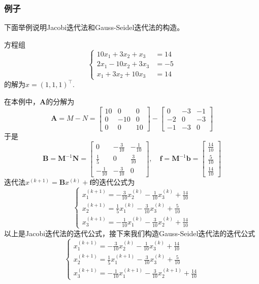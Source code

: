 \subsubsection{例子}
下面举例说明Jacobi迭代法和Gauss-Seidel迭代法的构造。
\begin{example}
    方程组
    $$
        \left\{\begin{aligned}
            10 x_1+3 x_2+x_3   & =14 \\
            2 x_1-10 x_2+3 x_3 & =-5 \\
            x_1+3 x_2+10 x_3   & =14
        \end{aligned}\right.
    $$
    的解为$x=(1,1,1)^\top$.
\end{example}
在本例中，$\boldsymbol{A}$的分解为
\[
    \boldsymbol{A}=M-N=\begin{bmatrix}
        10 & 0   & 0  \\
        0  & -10 & 0  \\
        0  & 0   & 10
    \end{bmatrix}-\begin{bmatrix}
        0  & -3 & -1 \\
        -2 & 0  & -3 \\
        -1 & -3 & 0
    \end{bmatrix}
\]
于是
\[
    \boldsymbol{B}=\boldsymbol{M}^{-1}\boldsymbol{N}=\begin{bmatrix}
        0             & -\frac{3}{10} & -\frac{1}{10} \\
        \frac{1}{5}   & 0             & \frac{3}{10}  \\
        -\frac{1}{10} & -\frac{3}{10} & 0
    \end{bmatrix},\quad \boldsymbol{f}=\boldsymbol{M}^{-1}\boldsymbol{b}=\begin{bmatrix}
        \frac{14}{10} \\
        \frac{5}{10}  \\
        \frac{14}{10}
    \end{bmatrix}
\]
迭代法$x^{(k+1)}=\boldsymbol{B}x^{(k)}+\boldsymbol{f}$的迭代公式为
\[
    \begin{cases}
        x_1^{(k+1)}=-\frac{3}{10}x_2^{(k)}-\frac{1}{10}x_3^{(k)}+\frac{14}{10} \\
        x_2^{(k+1)}=\frac{1}{5}x_1^{(k)}-\frac{3}{10}x_3^{(k)}+\frac{5}{10}    \\
        x_3^{(k+1)}=-\frac{1}{10}x_1^{(k)}-\frac{3}{10}x_2^{(k)}+\frac{14}{10}
    \end{cases}
\]
以上是Jacobi迭代法的迭代公式，接下来我们构造Gauss-Seidel迭代法的迭代公式
\[
    \begin{cases}
        x_1^{(k+1)}=-\frac{3}{10}x_2^{(k)}-\frac{1}{10}x_3^{(k)}+\frac{14}{10} \\
        x_2^{(k+1)}=\frac{1}{5}x_1^{(k+1)}-\frac{3}{10}x_3^{(k)}+\frac{5}{10}  \\
        x_3^{(k+1)}=-\frac{1}{10}x_1^{(k+1)}-\frac{3}{10}x_2^{(k+1)}+\frac{14}{10}
    \end{cases}
\]


